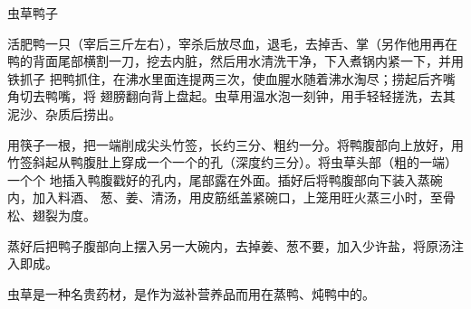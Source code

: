 \begin{recipe}{虫草鸭子}

\ingredients


\preparation

\step 活肥鸭一只（宰后三斤左右），宰杀后放尽血，退毛，去掉舌、掌（另作他用再在
鸭的背面尾部横割一刀，挖去内脏，然后用水清洗干净，下入煮锅内紧一下，并用铁抓子
把鸭抓住，在沸水里面连提两三次，使血腥水随着沸水淘尽；捞起后齐嘴角切去鸭嘴，将
翅膀翻向背上盘起。虫草用温水泡一刻钟，用手轻轻搓洗，去其泥沙、杂质后捞出。

\step 用筷子一根，把一端削成尖头竹签，长约三分、粗约一分。将鸭腹部向上放好，用
竹签斜起从鸭腹肚上穿成一个一个的孔（深度约三分）。将虫草头部（粗的一端）一个个
地插入鸭腹戳好的孔内，尾部露在外面。插好后将鸭腹部向下装入蒸碗内，加入料酒、
葱、姜、清汤，用皮筋纸盖紧碗口，上笼用旺火蒸三小时，至骨松、翅裂为度。

\step 蒸好后把鸭子腹部向上摆入另一大碗内，去掉姜、葱不要，加入少许盐，将原汤注
入即成。

\features

虫草是一种名贵药材，是作为滋补营养品而用在蒸鸭、炖鸭中的。

\end{recipe}

